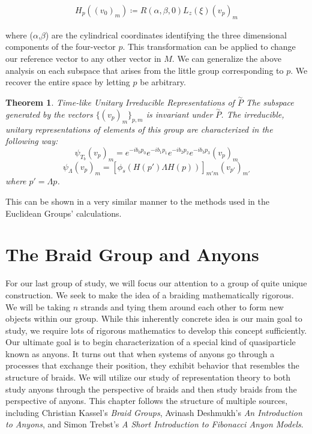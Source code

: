 \documentclass[10pt]{ucthesis}
\newtheorem{theorem}[definition]{Theorem}
\begin{document}
\begin{equation}
\begin{aligned}
	H_p((v_0)_m) \coloneq R(\alpha,\beta,0)L_z(\xi)(v_p)_m
\end{aligned}
\end{equation}

where ($\alpha$,$\beta$) are the cylindrical coordinates identifying the three dimensional components of the four-vector $p$. This transformation can be applied to change our reference vector to any other vector in $M$. We can generalize the above analysis on each subspace that arises from the little group corresponding to $p$. We recover the entire space by letting $p$ be arbitrary.

\begin{theorem} Time-like Unitary Irreducible Representations of $\overset{\sim}{P}$
	The subspace generated by the vectors $\{(v_p)_m\}_{p,m}$ is invariant under $\overset{\sim}{P}$. The irreducible, unitary representations of elements of this group are characterized in the following way:
$$\psi_{T_b} (v_p)_m = e^{-ib_0p_0}e^{-ib_1p_1}e^{-ib_2p_2}e^{-ib_3p_3}(v_p)_m$$
$$\psi_\Lambda (v_p)_m = [\phi_s(H(p')\Lambda H(p))]_{m'm} (v_{p'})_{m'}$$
where $p' = \Lambda p$.
\end{theorem}

This can be shown in a very similar manner to the methods used in the Euclidean Groups' calculations. 


\chapter{The Braid Group and Anyons}

For our last group of study, we will focus our attention to a group of quite unique construction. We seek to make the idea of a braiding mathematically rigorous. We will be taking $n$ strands and tying them around each other to form new objects within our group. While this inherently concrete idea is our main goal to study, we require lots of rigorous mathematics to develop this concept sufficiently. Our ultimate goal is to begin characterization of a special kind of quasiparticle known as anyons. It turns out that when systems of anyons go through a processes that exchange their position, they exhibit behavior that resembles the structure of braids. We will utilize our study of representation theory to both study anyons through the perspective of braids and then study braids from the perspective of anyons. This chapter follows the structure of multiple sources, including Christian Kassel's \textit{Braid Groups}, Avinash Deshmukh's \textit{An Introduction to Anyons}, and Simon Trebst's \textit{A Short Introduction to Fibonacci Anyon Models}. \cite{Kassel,Deshmukh,Trebst}
\end{document}

